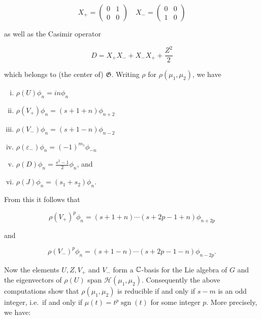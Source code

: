 \[
X_+ = \begin{pmatrix} 0 & 1 \\ 0 & 0 \end{pmatrix} \quad X_- = \begin{pmatrix} 0 & 0 \\ 1 & 0 \end{pmatrix}
\]

as well as the Casimir operator

\[
D = X_+X_- + X_-X_+ + \frac{Z^2}{2}
\]

which belongs to (the center of) $\mathfrak{G}$. Writing $\rho$ for $\rho(\mu_1, \mu_2)$, we have

\begin{enumerate}[(i)]

\item $\rho(U)\phi_n = in\phi_n$

\item $\rho(V_+)\phi_n = (s + 1 + n)\phi_{n+2}$

\item $\rho(V_-)\phi_n = (s + 1 - n)\phi_{n-2}$

\item $\rho(\varepsilon_{-})\phi_n = (-1)^{m_1}\phi_{-n}$

\item $\rho(D)\phi_n = \frac{s^2 - 1}{2}\phi_n$, and

\item $\rho(J)\phi_n = (s_1 + s_2)\phi_n$.

\end{enumerate}

From this it follows that

\[
\rho(V_+)^p\phi_n = (s + 1 + n) \cdots (s + 2p - 1 + n)\phi_{n+2p}
\]

and

\[
\rho(V_-)^p\phi_n = (s + 1 - n) \cdots (s + 2p - 1 - n)\phi_{n-2p}.
\]

Now the elements $U, Z, V_+$ and $V_-$ form a $\mathbb{C}$-basis for the Lie algebra of $G$ and the eigenvectors of $\rho(U)$ span $\mathcal{H}(\mu_1, \mu_2)$. Consequently the above computations show that $\rho(\mu_1, \mu_2)$ is reducible if and only if $s - m$ is an odd integer, i.e.\ if and only if $\mu(t) = t^p \operatorname{sgn}(t)$ for some integer $p$. More precisely, we have:

